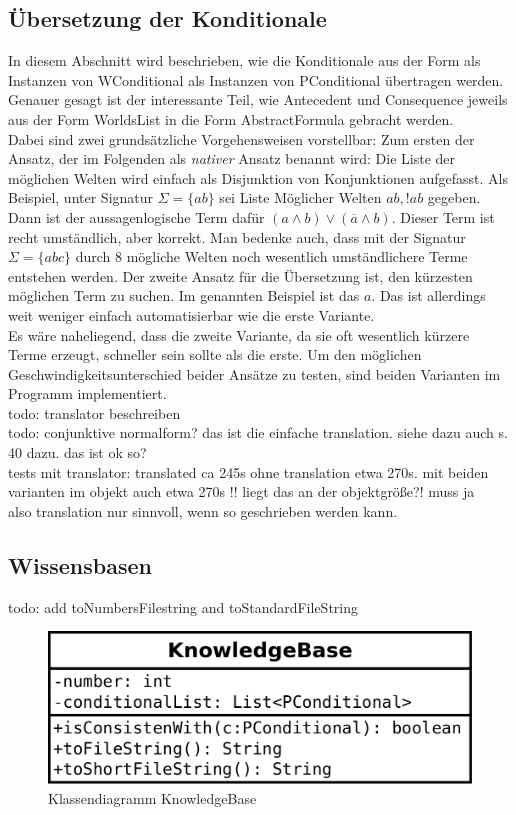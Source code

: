 \documentclass[12pt,a4paper]{article}
\begin{document}
\subsection{Übersetzung der Konditionale}
\label{sec:übersetzung}
In diesem Abschnitt wird beschrieben, wie die Konditionale aus der Form als Instanzen von WConditional als Instanzen von PConditional übertragen werden. Genauer gesagt ist der interessante Teil, wie Antecedent und Consequence jeweils aus der Form WorldsList in die Form AbstractFormula gebracht werden. \\
Dabei sind zwei grundsätzliche Vorgehensweisen vorstellbar: Zum ersten der Ansatz, der im Folgenden als \textit{nativer} Ansatz benannt wird: Die Liste der möglichen Welten wird einfach als Disjunktion von Konjunktionen aufgefasst. Als Beispiel, unter Signatur $\Sigma=\{ab\}$ sei Liste Möglicher Welten $ab, !ab$ gegeben. Dann ist der aussagenlogische Term dafür $(a \wedge b) \vee (\overline{a}\wedge b)$. Dieser Term ist recht umständlich, aber korrekt. Man bedenke auch, dass mit der Signatur $\Sigma=\{abc\}$ durch 8 mögliche Welten noch wesentlich umständlichere Terme entstehen werden. Der zweite Ansatz für die Übersetzung ist, den kürzesten möglichen Term zu suchen. Im genannten Beispiel ist das $a$. Das ist allerdings weit weniger einfach automatisierbar wie die erste Variante. \\
Es wäre naheliegend, dass die zweite Variante, da sie oft wesentlich kürzere Terme erzeugt, schneller sein sollte als die erste. Um den möglichen Geschwindigkeitsunterschied beider Ansätze zu testen, sind beiden Varianten im Programm implementiert.\\
todo: translator beschreiben \\
todo: conjunktive normalform? das ist die einfache translation. siehe dazu auch \cite{beierle19b} s. 40 dazu. das ist ok so? \\

tests mit translator: translated ca 245s ohne translation etwa 270s.
mit beiden varianten im objekt auch etwa 270s !! liegt das an der objektgröße?! muss ja \\
also translation nur sinnvoll, wenn so geschrieben werden kann.
\subsection{Wissensbasen}

todo: add toNumbersFilestring and toStandardFileString
\begin{figure}
\includegraphics[width=0.45\linewidth]{bilder/KnowledgeBase.png}
\caption{Klassendiagramm KnowledgeBase}
\label{pic:knowledgebase}
\end{figure}
\end{document}
